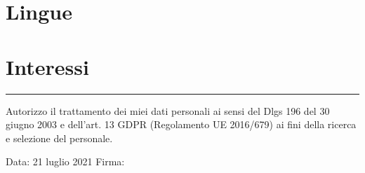 \documentclass[11pt,a4paper,sans]{moderncv} %
\begin{document}
\vspace{0.5cm}



\section{Lingue}



\section{Interessi}

\renewcommand{\listitemsymbol}{-~} %



\vfill

\noindent\rule{5cm}{1pt}

Autorizzo il trattamento dei miei dati personali ai sensi del Dlgs 196 del
30 giugno 2003 e dell’art. 13 GDPR (Regolamento UE 2016/679) ai
fini della ricerca e selezione del personale.

\vspace{1cm}

Data: 21 luglio 2021 \hspace{5cm} Firma:

\vspace{1cm}
\end{document}

